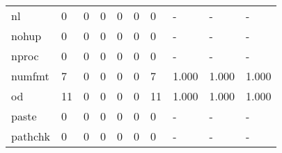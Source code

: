 \begin{longtable}{lp{2.0cm}p{2.0cm}p{2.0cm}p{2.0cm}p{2.0cm}p{2.0cm}p{2.0cm}p{2.0cm}p{2.0cm}}
nl        &                      0 &                                  0 &                                 0 &                                0 &                                 0 &                               0 &                                    - &                                      - &                                    - \\
nohup     &                      0 &                                  0 &                                 0 &                                0 &                                 0 &                               0 &                                    - &                                      - &                                    - \\
nproc     &                      0 &                                  0 &                                 0 &                                0 &                                 0 &                               0 &                                    - &                                      - &                                    - \\
numfmt    &                      7 &                                  0 &                                 0 &                                0 &                                 0 &                               7 &                                1.000 &                                  1.000 &                                1.000 \\
od        &                     11 &                                  0 &                                 0 &                                0 &                                 0 &                              11 &                                1.000 &                                  1.000 &                                1.000 \\
paste     &                      0 &                                  0 &                                 0 &                                0 &                                 0 &                               0 &                                    - &                                      - &                                    - \\
pathchk   &                      0 &                                  0 &                                 0 &                                0 &                                 0 &                               0 &                                    - &                                      - &                                    - \\

\end{longtable}
